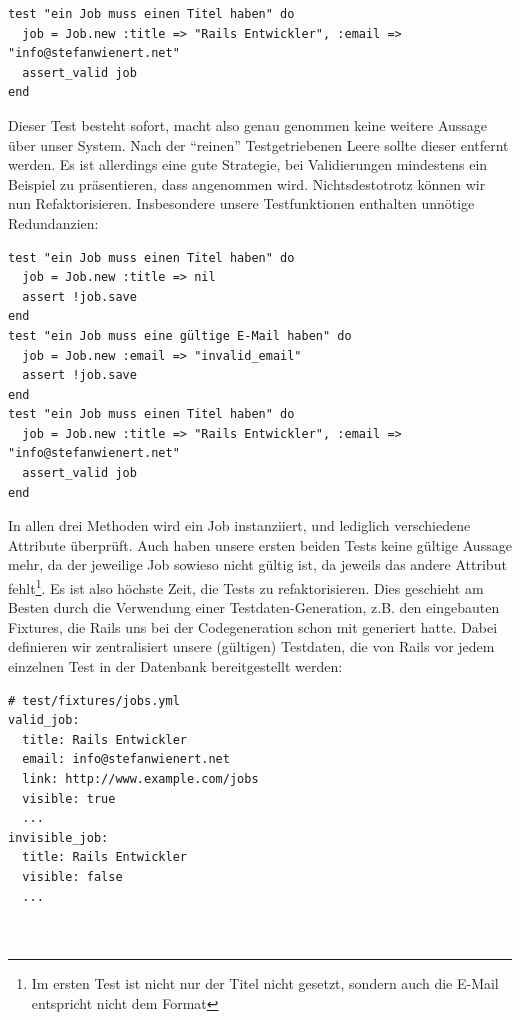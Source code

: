 \begin{lstlisting}
test "ein Job muss einen Titel haben" do
  job = Job.new :title => "Rails Entwickler", :email => "info@stefanwienert.net"
  assert_valid job
end
\end{lstlisting}
\tddgreen
Dieser Test besteht sofort, macht also genau genommen keine weitere Aussage über unser System. Nach der "`reinen"' Testgetriebenen Leere sollte dieser entfernt werden. Es ist allerdings eine gute Strategie, bei Validierungen mindestens ein Beispiel zu präsentieren, dass angenommen wird. Nichtsdestotrotz können wir nun Refaktorisieren. Insbesondere unsere Testfunktionen enthalten unnötige Redundanzien:

\begin{lstlisting}
test "ein Job muss einen Titel haben" do
  job = Job.new :title => nil
  assert !job.save
end
test "ein Job muss eine gültige E-Mail haben" do
  job = Job.new :email => "invalid_email"
  assert !job.save
end
test "ein Job muss einen Titel haben" do
  job = Job.new :title => "Rails Entwickler", :email => "info@stefanwienert.net"
  assert_valid job
end
\end{lstlisting}
\tddrefactor
In allen drei Methoden wird ein Job instanziiert, und lediglich verschiedene Attribute überprüft. Auch haben unsere ersten beiden Tests keine gültige Aussage mehr, da der jeweilige Job sowieso nicht gültig ist, da jeweils das andere Attribut fehlt\footnote{Im ersten Test ist nicht nur der Titel nicht gesetzt, sondern auch die E-Mail entspricht nicht dem Format}. Es ist also höchste Zeit, die Tests zu refaktorisieren. Dies geschieht am Besten durch die Verwendung einer Testdaten-Generation, z.B. den eingebauten Fixtures, die Rails uns bei der Codegeneration schon mit generiert hatte. Dabei definieren wir zentralisiert unsere (gültigen) Testdaten, die von Rails vor jedem einzelnen Test in der Datenbank bereitgestellt werden:

\begin{lstlisting}
# test/fixtures/jobs.yml
valid_job:
  title: Rails Entwickler
  email: info@stefanwienert.net
  link: http://www.example.com/jobs
  visible: true
  ...
invisible_job:
  title: Rails Entwickler
  visible: false
  ...
  
  
\end{lstlisting}

